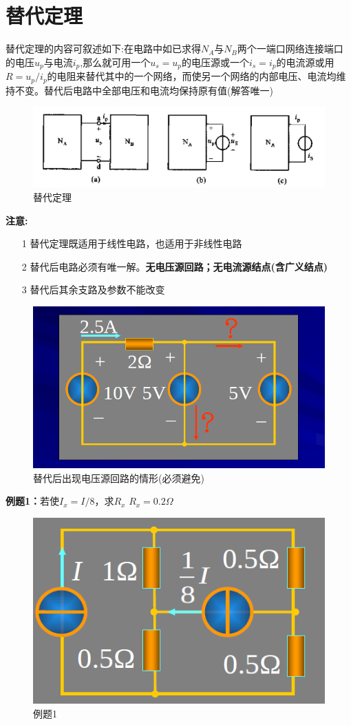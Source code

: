 \documentclass[11pt,a4paper,oneside]{book}
\begin{document}
\section{替代定理}
替代定理的内容可叙述如下:在电路中如已求得$N_A$与$N_B$两个一端口网络连接端口的电压$u_p$与电流$i_p$,那么就可用一个$u_s=u_p$的电压源或一个$i_s=i_p$的电流源或用$R=u_p/i_p$的电阻来替代其中的一个网络，而使另一个网络的内部电压、电流均维持不变。替代后电路中全部电压和电流均保持原有值(解答唯一)
\begin{figure}[H]
	\centering
	\includegraphics[width=0.7\linewidth]{screenshot055}
	\caption{替代定理}
	\label{fig:screenshot055}
\end{figure}

\noindent\textbf{注意:}
\begin{enumerate}
	\item[1] 替代定理既适用于线性电路，也适用于非线性电路
	\item[2] 替代后电路必须有唯一解。\textbf{无电压源回路；无电流源结点(含广义结点)}
	\item[3] 替代后其余支路及参数不能改变
\end{enumerate}
\begin{figure}[H]
	\centering
	\includegraphics[width=0.5\linewidth]{screenshot056}
	\caption{替代后出现电压源回路的情形(必须避免)}
	\label{fig:screenshot056}
\end{figure}

\noindent\textbf{例题1：}若使$I_x=I/8$，求$R_x$  \quad $R_x=0.2\Omega$
\begin{figure}[H]
	\centering
	\includegraphics[width=0.5\linewidth]{screenshot057}
	\caption{例题1}
	\label{fig:screenshot057}
\end{figure}
\end{document}
